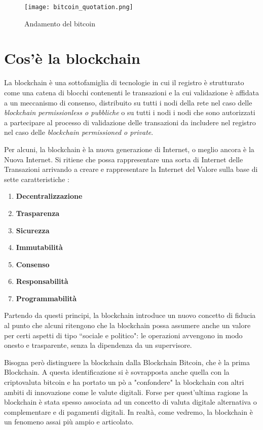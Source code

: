 \begin{figure}[htbp]
  \centering
  \texttt{[image: bitcoin\_quotation.png]}
  \caption{Andamento del bitcoin}
  \label{fig:bitcoin_quotation}
\end{figure}

\section{Cos'è la blockchain}
La blockchain è una sottofamiglia di tecnologie in cui il registro è strutturato come una catena di blocchi contenenti le transazioni e la cui validazione è affidata a un meccanismo di consenso, distribuito su tutti i nodi della rete nel caso delle \textit{blockchain permissionless o pubbliche} o su tutti i nodi i nodi che sono autorizzati a partecipare al processo di validazione delle transazioni da includere nel registro nel caso delle \textit{blockchain permissioned o private}.

Per alcuni, la blockchain è la nuova generazione di Internet, o meglio ancora è la Nuova Internet. Si ritiene che possa rappresentare una sorta di Internet delle Transazioni arrivando a creare e rappresentare la Internet del Valore sulla base di sette caratteristiche \cite{bellini_2021}:

\begin{enumerate}
  \item \textbf{Decentralizzazione}
  \item \textbf{Trasparenza}
  \item \textbf{Sicurezza}
  \item \textbf{Immutabilità}
  \item \textbf{Consenso}
  \item \textbf{Responsabilità}
  \item \textbf{Programmabilità}
\end{enumerate}

Partendo da questi principi, la blockchain introduce un nuovo concetto di fiducia al punto che alcuni ritengono che la blockchain possa assumere anche un valore per certi aspetti di tipo “sociale e politico": le operazioni avvengono in modo onesto e trasparente, senza la dipendenza da un supervisore.

Bisogna però distinguere la blockchain dalla Blockchain Bitcoin, che è la prima Blockchain. A questa identificazione si è sovrapposta anche quella con la criptovaluta bitcoin e ha portato un pò a "confondere" la blockchain con altri ambiti di innovazione come le valute digitali. Forse per quest'ultima ragione la blockchain è stata spesso associata ad un concetto di valuta digitale alternativa o complementare e di pagamenti digitali. In realtà, come vedremo, la blockchain è un fenomeno assai più ampio e articolato.

